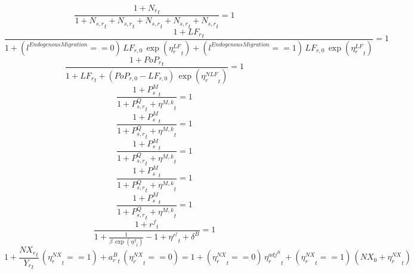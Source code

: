 \noindent[name= `regional total employment 1']
\begin{dmath}
\frac{1+{{N_r}}_{t}}{1+{{N_{s,r}}}_{t}+{{N_{s,r}}}_{t}+{{N_{s,r}}}_{t}+{{N_{s,r}}}_{t}+{{N_{s,r}}}_{t}}=1
\end{dmath}
\noindent[name= `regional labour force 1']
\begin{dmath}
\frac{1+{{LF_r}}_{t}}{1+\left({{l^{Endogenous Migration}}}==0\right)\, {{LF_{r,0}}}\, \exp\left({{\eta^{LF}_{r}}}_{t}\right)+\left({{l^{Endogenous Migration}}}==1\right)\, {{LF_{r,0}}}\, \exp\left({{\eta^{LF}_{r}}}_{t}\right)}=1
\end{dmath}
\noindent[name= `regional population 1']
\begin{dmath}
\frac{1+{{PoP_r}}_{t}}{1+{{LF_r}}_{t}+\left({{PoP_{r,0}}}-{{LF_{r,0}}}\right)\, \exp\left({{\eta^{NLF}_{r}}}_{t}\right)}=1
\end{dmath}
\noindent[name= `import price 1']
\begin{dmath}
\frac{1+{{P^{M}_s}}_{t}}{1+{{P^Q_{s,r}}}_{t}+{{\eta^{M,k}}}_{t}}=1
\end{dmath}
\noindent[name= `import price 2']
\begin{dmath}
\frac{1+{{P^{M}_s}}_{t}}{1+{{P^Q_{s,r}}}_{t}+{{\eta^{M,k}}}_{t}}=1
\end{dmath}
\noindent[name= `import price 3']
\begin{dmath}
\frac{1+{{P^{M}_s}}_{t}}{1+{{P^Q_{s,r}}}_{t}+{{\eta^{M,k}}}_{t}}=1
\end{dmath}
\noindent[name= `import price 4']
\begin{dmath}
\frac{1+{{P^{M}_s}}_{t}}{1+{{P^Q_{s,r}}}_{t}+{{\eta^{M,k}}}_{t}}=1
\end{dmath}
\noindent[name= `import price 5']
\begin{dmath}
\frac{1+{{P^{M}_s}}_{t}}{1+{{P^Q_{s,r}}}_{t}+{{\eta^{M,k}}}_{t}}=1
\end{dmath}
\noindent[name= `world interest rate']
\begin{dmath}
\frac{1+{{r^{f}}}_{t}}{1+\frac{1}{{{\beta}}\, \exp\left({{\eta^{\beta}}}_{t}\right)}-1+{{\eta^{r^f}}}_{t}+{{\delta^B}}}=1
\end{dmath}
\noindent[name= `net export to GDP ratio 1']
\begin{dmath}
1+\frac{{{NX_r}}_{t}}{{{Y_r}}_{t}}\, \left({{\eta^{NX}_r}}_{t}==1\right)+{a^B_r}_{t}\, \left({{\eta^{NX}_r}}_{t}==0\right)=1+\left({{\eta^{NX}_r}}_{t}==0\right)\, {{\eta^{adj^B}_r}}_{t}+\left({{\eta^{NX}_r}}_{t}==1\right)\, \left({{NX_0}}+{{\eta^{NX}_r}}_{t}\right)
\end{dmath}
